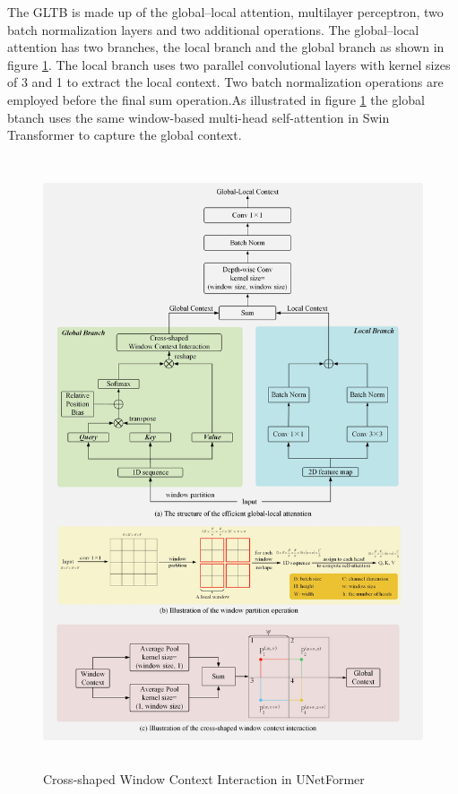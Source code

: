 The GLTB is made up of the global–local attention, multilayer perceptron, two batch normalization layers and two additional operations. The global–local attention has two  branches, the local branch and the global branch as shown in figure \ref{fig:unetformer-besar}. The local branch uses two parallel convolutional layers with kernel sizes of 3 and 1 to extract the local context. Two batch normalization operations are employed before the final sum operation.As illustrated in figure \ref{fig:unetformer-besar} the global btanch uses the same window-based multi-head self-attention in Swin Transformer to capture the global context.
\FloatBarrier
\begin{figure}[ht]
\includegraphics[width=13.5cm, height=18cm]{images/unetformer besar.jpg}
\centering
\caption{Cross-shaped Window Context Interaction in UNetFormer}
\label{fig:unetformer-besar}
\end{figure}
\FloatBarrier

